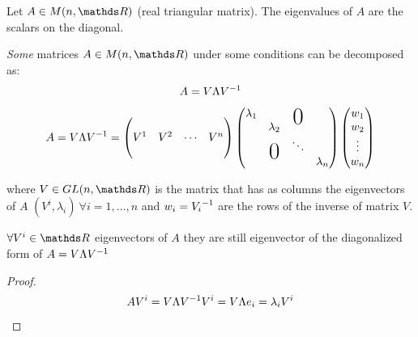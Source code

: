 \documentclass[ComputationalMathematics.tex]{subfiles}
\begin{document}
\begin{theorem}
  Let $A \in M(n, \R)$ (real triangular matrix). The eigenvalues of $A$ are the scalars on the diagonal.
\end{theorem}


\begin{definition}
 \emph{Some} matrices $A \in M(n, \R)$ under some conditions can be decomposed as:
\[
  A = V \Lambda {V}^{-1}
\]
\[
  A = V \Lambda \inv{V} = \begin{pmatrix}
    \\
    V^1 & V^2 & \cdots & V^n\\
    \\
  \end{pmatrix} 
  \begin{pmatrix}
    \lambda_1&&\bigzero\\
    &\lambda_2\\
    &\bigzero& \ddots\\
    &&&\lambda_n\\
  \end{pmatrix} 
  \begin{pmatrix}
    w_1\\
    w_2\\
    \vdots\\
    w_n\\
  \end{pmatrix}
\]

  where $V \in GL(n, \R)$ is the matrix that has as columns the eigenvectors of $A$ $(V^i, \lambda_i)~\forall i=1, \ldots, n$ and $w_i = {V_i}^{-1}$ are the rows of the inverse of matrix $V$.\\
\end{definition}

\begin{proposition}
  $\forall V^i \in \R$ eigenvectors of $A$ they are still eigenvector of the diagonalized form of $A=V \Lambda {V}^{-1}$
\end{proposition}

\begin{proof}
  \[
    AV^i = V \Lambda {V}^{-1} V^i = V \Lambda e_i = \lambda_i V^i
  \]
\end{proof}
\end{document}
